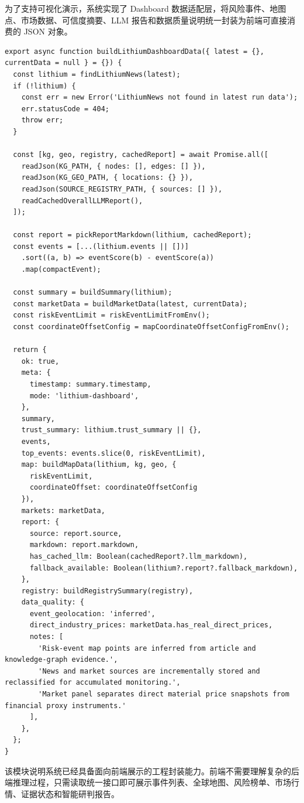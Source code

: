 ﻿\documentclass[12pt,a4paper]{article}
\begin{document}
为了支持可视化演示，系统实现了 Dashboard 数据适配层，将风险事件、地图点、市场数据、可信度摘要、LLM 报告和数据质量说明统一封装为前端可直接消费的 JSON 对象。

\begin{lstlisting}[style=projectcode,caption={风险仪表盘数据聚合与前端适配}]
export async function buildLithiumDashboardData({ latest = {}, currentData = null } = {}) {
  const lithium = findLithiumNews(latest);
  if (!lithium) {
    const err = new Error('LithiumNews not found in latest run data');
    err.statusCode = 404;
    throw err;
  }

  const [kg, geo, registry, cachedReport] = await Promise.all([
    readJson(KG_PATH, { nodes: [], edges: [] }),
    readJson(KG_GEO_PATH, { locations: {} }),
    readJson(SOURCE_REGISTRY_PATH, { sources: [] }),
    readCachedOverallLLMReport(),
  ]);

  const report = pickReportMarkdown(lithium, cachedReport);
  const events = [...(lithium.events || [])]
    .sort((a, b) => eventScore(b) - eventScore(a))
    .map(compactEvent);

  const summary = buildSummary(lithium);
  const marketData = buildMarketData(latest, currentData);
  const riskEventLimit = riskEventLimitFromEnv();
  const coordinateOffsetConfig = mapCoordinateOffsetConfigFromEnv();

  return {
    ok: true,
    meta: {
      timestamp: summary.timestamp,
      mode: 'lithium-dashboard',
    },
    summary,
    trust_summary: lithium.trust_summary || {},
    events,
    top_events: events.slice(0, riskEventLimit),
    map: buildMapData(lithium, kg, geo, {
      riskEventLimit,
      coordinateOffset: coordinateOffsetConfig
    }),
    markets: marketData,
    report: {
      source: report.source,
      markdown: report.markdown,
      has_cached_llm: Boolean(cachedReport?.llm_markdown),
      fallback_available: Boolean(lithium?.report?.fallback_markdown),
    },
    registry: buildRegistrySummary(registry),
    data_quality: {
      event_geolocation: 'inferred',
      direct_industry_prices: marketData.has_real_direct_prices,
      notes: [
        'Risk-event map points are inferred from article and knowledge-graph evidence.',
        'News and market sources are incrementally stored and reclassified for accumulated monitoring.',
        'Market panel separates direct material price snapshots from financial proxy instruments.'
      ],
    },
  };
}
\end{lstlisting}

该模块说明系统已经具备面向前端展示的工程封装能力。前端不需要理解复杂的后端推理过程，只需读取统一接口即可展示事件列表、全球地图、风险榜单、市场行情、证据状态和智能研判报告。
\end{document}
